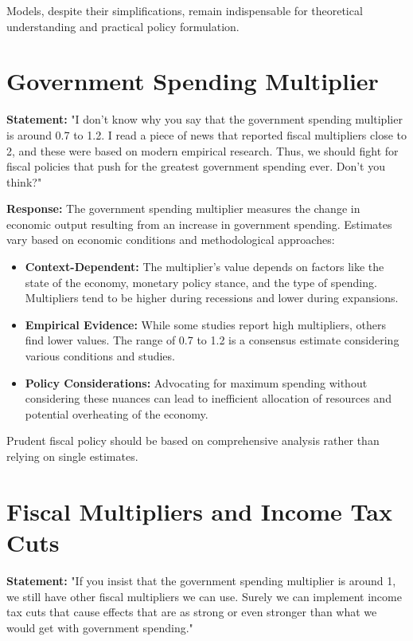 \documentclass{article}
\begin{document}
Models, despite their simplifications, remain indispensable for theoretical understanding and practical policy formulation.

\hrulefill

\section{Government Spending Multiplier}

\textbf{Statement:} "I don’t know why you say that the government spending multiplier is around 0.7 to 1.2. I read a piece of news that reported fiscal multipliers close to 2, and these were based on modern empirical research. Thus, we should fight for fiscal policies that push for the greatest government spending ever. Don’t you think?"

\textbf{Response:}
The government spending multiplier measures the change in economic output resulting from an increase in government spending. Estimates vary based on economic conditions and methodological approaches:

\begin{itemize}
    \item \textbf{Context-Dependent:} The multiplier's value depends on factors like the state of the economy, monetary policy stance, and the type of spending. Multipliers tend to be higher during recessions and lower during expansions.
    \item \textbf{Empirical Evidence:} While some studies report high multipliers, others find lower values. The range of 0.7 to 1.2 is a consensus estimate considering various conditions and studies.
    \item \textbf{Policy Considerations:} Advocating for maximum spending without considering these nuances can lead to inefficient allocation of resources and potential overheating of the economy.
\end{itemize}

Prudent fiscal policy should be based on comprehensive analysis rather than relying on single estimates.

\hrulefill

\section{Fiscal Multipliers and Income Tax Cuts}

\textbf{Statement:} "If you insist that the government spending multiplier is around 1, we still have other fiscal multipliers we can use. Surely we can implement income tax cuts that cause effects that are as strong or even stronger than what we would get with government spending."
\end{document}
